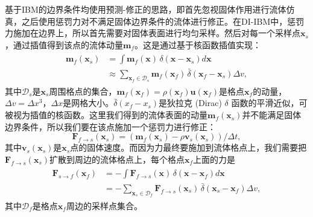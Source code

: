 基于IBM的边界条件均使用预测-修正的思路，即首先忽视固体作用进行流体仿真，之后使用惩罚力对不满足固体边界条件的流体进行修正。在DI-IBM中，惩罚力施加在边界上，所以首先需要对固体表面进行均匀采样。然后对每一个采样点$\mathbf{x}_s$，通过插值得到该点的流体动量$\mathbf{m}_f$。这是通过基于核函数插值实现：
\begin{align}
    \begin{split} 
\boldsymbol{m}_{f}\left(\boldsymbol{x}_{s}\right) & =\int \boldsymbol{m}_{f}(\boldsymbol{x}) \, \delta(\boldsymbol{x}-\boldsymbol{x}_{s}) d \boldsymbol{x} \\
& \approx \sum_{\boldsymbol{x}_{f} \in \mathcal{D}_{s}} \boldsymbol{m}_{f}(\boldsymbol{x}_{f}) \, \bar{\delta}(\boldsymbol{x}_{f}-\boldsymbol{x}_{s}) \Delta v ,
    \end{split}
\end{align}
其中$\mathcal{D}_{s}$是$\boldsymbol{x}_{s}$周围格点的集合，$\boldsymbol{m}_{f}(\boldsymbol{x}_{f})=\rho(\boldsymbol{x}_{f})\boldsymbol{u}(\boldsymbol{x}_{f})$是格点$\boldsymbol{x}_{f}$的动量，$\Delta v=\Delta x^3$，$\Delta x$是网格大小。$\bar{\delta}\left(x_{f}-x_{s}\right)$是狄拉克 (Dirac) $\delta$ 函数的平滑近似，可被视为插值的核函数。这里我们得到的流体表面的动量$\boldsymbol{m}_{f}\left(\boldsymbol{x}_{s}\right)$并不能满足固体边界条件，所以我们要在该点施加一个惩罚力进行修正：
\begin{equation}
    \boldsymbol{F}_{f \rightarrow s}\left(\boldsymbol{x}_{s}\right)=\left(\boldsymbol{m}_{f}(\boldsymbol{x}_{s})-\rho \boldsymbol{v}_{s}(\boldsymbol{x}_{s})\right) / \Delta t ,
\end{equation}
其中$\boldsymbol{v}_{s}\left(\boldsymbol{x}_{s}\right)$是$\boldsymbol{x}_{s}$点的固体速度。而因为力最终要施加到流体格点上，我们需要把$\boldsymbol{F}_{f \rightarrow s}\left(\boldsymbol{x}_{s}\right)$扩散到周边的流体格点上，每个格点$\boldsymbol{x}_{f}$上面的力是
\begin{align}
    \begin{split}
\boldsymbol{F}_{s \rightarrow f}\left(\boldsymbol{x}_{f}\right) & =-\int \boldsymbol{F}_{f \rightarrow s}(\boldsymbol{x}) \, \delta(\boldsymbol{x}-\boldsymbol{x}_{f}) d \boldsymbol{x} \\
& =-\sum_{\boldsymbol{x}_{s} \in \mathcal{D}_{f}} \boldsymbol{F}_{f \rightarrow s}(\boldsymbol{x}_{s}) \, \bar{\delta}(\boldsymbol{x}_{s}-\boldsymbol{x}_{f}) \Delta v ,
    \end{split}
\end{align}
其中$\mathcal{D}_{f}$是格点$\boldsymbol{x}_{f}$周边的采样点集合。

